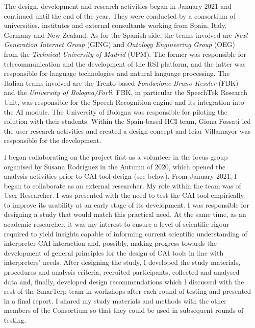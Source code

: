 The design, development and research activities began in January 2021 and continued until the end of the year. They were conducted by a consortium of universities, institutes and external consultants working from Spain, Italy, Germany and New Zealand. As for the Spanish side, the teams involved are \textit{Next Generation Internet Group} (GING) and \textit{Ontology Engineering Group} (OEG) from the \textit{Technical University of Madrid} (UPM). The former was responsible for telecommunication and the development of the RSI platform, and the latter was responsible for language technologies and natural language processing. The Italian teams involved are the Trento-based \textit{Fondazione Bruno Kessler} (FBK) and the \textit{University of Bologna/Forlì}. FBK, in particular the SpeechTek Research Unit, was responsible for the Speech Recognition engine and its integration into the AI module. The University of Bologna was responsible for piloting the solution with their students. Within the Spain-based HCI team, Giona Fossati led the user research activities and created a design concept and Iciar Villamayor was responsible for the development.

I began collaborating on the project first as a volunteer in the focus group organised by Susana Rodríguez in the Autumn of 2020, which opened the analysis activities prior to CAI tool design (see below). From January 2021, I began to collaborate as an external researcher. My role within the team was of User Researcher. I was presented with the need to test the CAI tool empirically to improve its usability at an early stage of its development.  I was responsible for designing a study that would match this practical need. At the same time, as an academic researcher, it was my interest to ensure a level of scientific rigour required to yield insights capable of informing current scientific understanding of interpreter-CAI interaction and, possibly, making progress towards the development of general principles for the design of CAI tools in line with interpreters’ needs. After designing the study, I developed the study materials, procedures and analysis criteria, recruited participants, collected and analysed data and, finally, developed design recommendations which I discussed with the rest of the SmarTerp team in workshops after each round of testing and presented in a final report. I shared my study materials and methods with the other members of the Consortium so that they could be used in subsequent rounds of testing.

